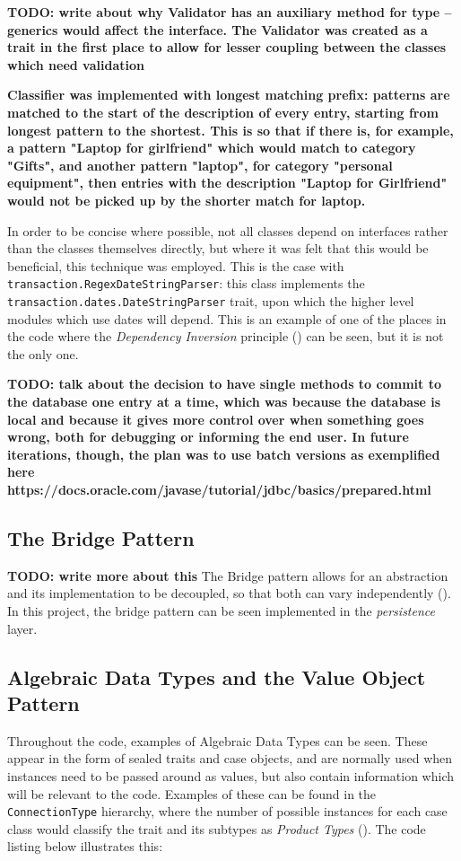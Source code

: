 \textbf{TODO: write about why Validator has an auxiliary method for type --
generics would affect the interface. The Validator was created as a trait in
the first place to allow for lesser coupling between the classes which need
validation}

\textbf{Classifier was implemented with longest matching prefix: patterns are
matched to the start of the description of every entry, starting from longest
pattern to the shortest. This is so that if there is, for example, a pattern
"Laptop for girlfriend" which would match to category "Gifts", and another
pattern "laptop", for category "personal equipment", then entries with the
description "Laptop for Girlfriend" would not be picked up by the shorter match
for laptop.}

In order to be concise where possible, not all classes depend on interfaces
rather than the classes themselves directly, but where it was felt that this
would be beneficial, this technique was employed. This is the case with
\texttt{transaction.RegexDateStringParser}: this class implements the
\texttt{transaction.dates.DateStringParser} trait, upon which the higher level
modules which use dates will depend. This is an example of one of the places in
the code where the \emph{Dependency Inversion} principle
(\cite[][]{martin1996dependency}) can be seen, but it is not the only one.

\textbf{TODO: talk about the decision to have single methods to commit to the
database one entry at a time, which was because the database is local and
because it gives more control over when something goes wrong, both for
debugging or informing the end user. In future iterations, though, the plan was
to use batch versions as exemplified here
https://docs.oracle.com/javase/tutorial/jdbc/basics/prepared.html}

\subsection{The Bridge Pattern} \label{sec:Implementation.TheBridgePattern}
\textbf{TODO: write more about this}
The Bridge pattern allows for an abstraction and its implementation to be
decoupled, so that both can vary independently
(\cite[][Ch.~7,Location~2699]{nikolov2016scala}). In this project, the bridge
pattern can be seen implemented in the \emph{persistence} layer.

\subsection{Algebraic Data Types and the Value Object Pattern} \label{sec:Implementation.ADTAndValueObject}
Throughout the code, examples of Algebraic Data Types can be seen. These appear
in the form of sealed traits and case objects, and are normally used when
instances need to be passed around as values, but also contain information which will
be relevant to the code. Examples of these can be found in the
\texttt{ConnectionType} hierarchy, where the number of possible instances for
each case class would classify the trait and its subtypes as \emph{Product
Types} (\cite[][p.~411]{wampler2015programming}). The code listing below
illustrates this:

